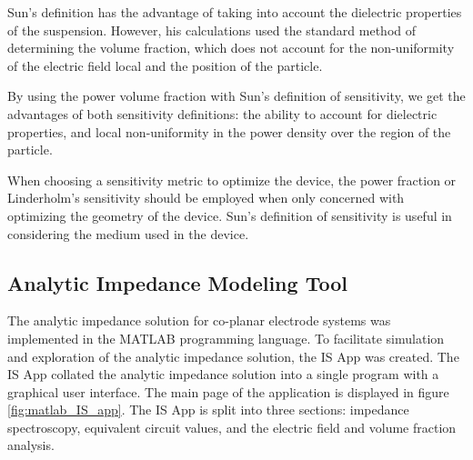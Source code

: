 \par Sun's definition has the advantage of taking into account the dielectric properties of the suspension. However, his calculations used the standard method of determining the volume fraction, which does not account for the non-uniformity of the electric field local and the position of the particle. 

\par By using the power volume fraction with Sun's definition of sensitivity, we get the advantages of both sensitivity definitions: the ability to account for dielectric properties, and local non-uniformity in the power density over the region of the particle.

\par When choosing a sensitivity metric to optimize the device, the power fraction or Linderholm's sensitivity should be employed when only concerned with optimizing the geometry of the device. Sun's definition of sensitivity is useful in considering the medium used in the device.






\subsection{Analytic Impedance Modeling Tool}

\par The analytic impedance solution for co-planar electrode systems was implemented in the MATLAB programming language. To facilitate simulation and exploration of the analytic impedance solution, the IS App was created. The IS App collated the analytic impedance solution into a single program with a graphical user interface. The main page of the application is displayed in figure \ref{fig:matlab_IS_app}. The IS App is split into three sections: impedance spectroscopy, equivalent circuit values, and the electric field and volume fraction analysis. 

